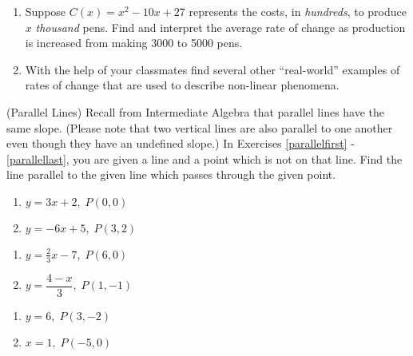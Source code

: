 \begin{enumerate}
\begin{enumerate}
\end{enumerate}

\item  Suppose $C(x) = x^2-10x+27$ represents the costs, in \textit{hundreds}, to produce $x$ \textit{thousand} pens.  Find and interpret the average rate of change as production is increased from making 3000 to 5000 pens.


\item With the help of your classmates find several other ``real-world'' examples of rates of change that are used to describe non-linear phenomena.


\setcounter{HW}{\value{enumi}}
\end{enumerate}


\label{parallellines}

(Parallel Lines) Recall from Intermediate Algebra that parallel lines have the same slope.  (Please note that two vertical lines are also parallel to one another even though they have an undefined slope.)  In Exercises \ref{parallelfirst} - \ref{parallellast}, you are given a line and a point which is not on that line.  Find the line parallel to the given line which passes through the given point.


\begin{multicols}{2}
\begin{enumerate}
\setcounter{enumi}{\value{HW}}

\item $y = 3x + 2, \; P(0, 0)$ \label{parallelfirst}
\item $y = -6x + 5, \; P(3, 2)$

\setcounter{HW}{\value{enumi}}
\end{enumerate}
\end{multicols}


\begin{multicols}{2}
\begin{enumerate}
\setcounter{enumi}{\value{HW}}

\item $y = \frac{2}{3} x - 7, \; P(6, 0)$
\item $y = \dfrac{4-x}{3}, \; P(1, -1)$


\setcounter{HW}{\value{enumi}}
\end{enumerate}
\end{multicols}


\begin{multicols}{2}
\begin{enumerate}
\setcounter{enumi}{\value{HW}}

\item $y = 6, \; P(3, -2)$
\item $x=1, \; P(-5,0)$ \label{parallellast}


\setcounter{HW}{\value{enumi}}
\end{enumerate}
\end{multicols}


